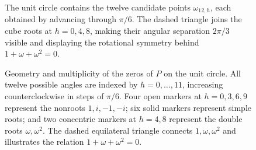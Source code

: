 \documentclass[11pt,a4paper]{article}
\numberwithin{equation}{section}
\theoremstyle{uprightpaper}
\begin{document}
\begin{figure}[htbp]
\centering
\begin{minipage}[c]{0.41\linewidth}
\small\setlength{\parindent}{0pt}
The unit circle contains the twelve candidate points
$\omega_{12,h}$, each obtained by advancing through $\pi/6$.
The dashed triangle joins the cube roots at $h=0,4,8$, making their angular separation
$2\pi/3$ visible and displaying the rotational symmetry behind $1+\omega+\omega^2=0$.
\end{minipage}\hfill
\begin{minipage}[c]{0.55\linewidth}
\centering
{}
\end{minipage}
\caption{Geometry and multiplicity of the zeros of $P$ on the unit circle.
All twelve possible angles are indexed by $h=0,\ldots,11$, increasing
counterclockwise in steps of $\pi/6$. Four open markers at
$h=0,3,6,9$ represent the nonroots $1,i,-1,-i$; six solid markers
represent simple roots; and two concentric markers at $h=4,8$
represent the double roots $\omega,\omega^2$. The dashed equilateral
triangle connects $1,\omega,\omega^2$ and illustrates the relation
$1+\omega+\omega^2=0$.}
\label{fig:roots}
\end{figure}
\end{document}
